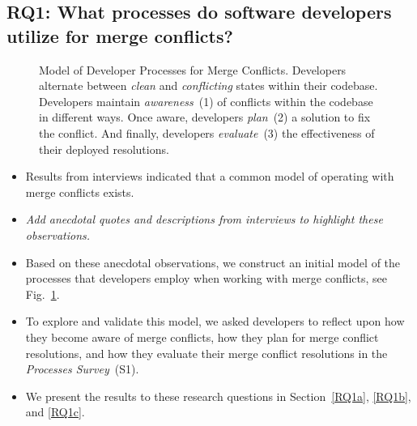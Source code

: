 
\subsection{\textbf{RQ1:} What processes do software developers utilize for merge conflicts?}\label{RQ1}

\begin{figure}[!htbp]
\centering
{}
\caption{Model of Developer Processes for Merge Conflicts. Developers alternate between \textit{clean} and \textit{conflicting} states within their codebase. Developers maintain \textit{awareness}~(1) of conflicts within the codebase in different ways. Once aware, developers \textit{plan}~(2) a solution to fix the conflict. And finally, developers \textit{evaluate}~(3) the effectiveness of their deployed resolutions.}
\label{model}
\end{figure}

\begin{itemize}
  \item Results from interviews indicated that a common model of operating with merge conflicts exists.
  \item \textit{Add anecdotal quotes and descriptions from interviews to highlight these observations.}
  \item Based on these anecdotal observations, we construct an initial model of the processes that developers employ when working with merge conflicts, see Fig.~\ref{model}.
  \item To explore and validate this model, we asked developers to reflect upon how they become aware of merge conflicts, how they plan for merge conflict resolutions, and how they evaluate their merge conflict resolutions in the \textit{Processes Survey}~(S1).
  \item We present the results to these research questions in Section~\ref{RQ1a}, \ref{RQ1b}, and \ref{RQ1c}.
\end{itemize}

